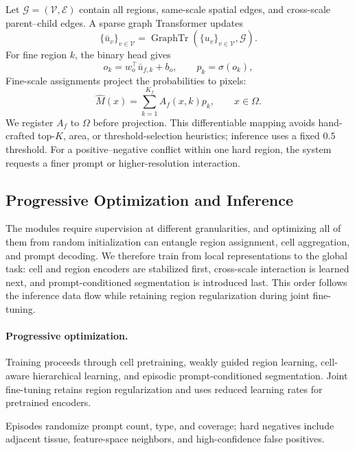 \documentclass[letterpaper]{article}
\begin{document}
Let $\mathcal{G}=(\mathcal{V},\mathcal{E})$ contain all regions, same-scale spatial edges, and cross-scale parent--child edges. A sparse graph Transformer updates
\begin{equation}
\{\bar u_v\}_{v\in\mathcal{V}}
=\operatorname{GraphTr}\!\left(
\{u_v\}_{v\in\mathcal{V}},\mathcal{G}
\right).
\label{eq:graph-decode}
\end{equation}
For fine region $k$, the binary head gives
\begin{equation}
o_k=w_o^\top\bar u_{f,k}+b_o,\qquad p_k=\sigma(o_k),
\label{eq:region-prob}
\end{equation}
Fine-scale assignments project the probabilities to pixels:
\begin{equation}
\widehat M(x)=\sum_{k=1}^{K_f}A_f(x,k)p_k,\qquad x\in\Omega.
\label{eq:projection}
\end{equation}
We register $A_f$ to $\Omega$ before projection. This differentiable mapping avoids hand-crafted top-$K$, area, or threshold-selection heuristics; inference uses a fixed $0.5$ threshold. For a positive--negative conflict within one hard region, the system requests a finer prompt or higher-resolution interaction.

\subsection{Progressive Optimization and Inference}
The modules require supervision at different granularities, and optimizing all of them from random initialization can entangle region assignment, cell aggregation, and prompt decoding. We therefore train from local representations to the global task: cell and region encoders are stabilized first, cross-scale interaction is learned next, and prompt-conditioned segmentation is introduced last. This order follows the inference data flow while retaining region regularization during joint fine-tuning.

\paragraph{Progressive optimization.}
Training proceeds through cell pretraining, weakly guided region learning, cell-aware hierarchical learning, and episodic prompt-conditioned segmentation. Joint fine-tuning retains region regularization and uses reduced learning rates for pretrained encoders.

Episodes randomize prompt count, type, and coverage; hard negatives include adjacent tissue, feature-space neighbors, and high-confidence false positives.
\end{document}
